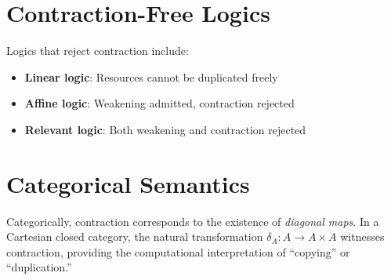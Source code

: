 \section*{Contraction-Free Logics}
\label{sec-contraction-free}

Logics that reject contraction include:
\begin{itemize}
    \item \textbf{Linear logic}: Resources cannot be duplicated freely
    \item \textbf{Affine logic}: Weakening admitted, contraction rejected
    \item \textbf{Relevant logic}: Both weakening and contraction rejected
\end{itemize}

\section*{Categorical Semantics}
\label{sec-contraction-categorical}

Categorically, contraction corresponds to the existence of \emph{diagonal maps}. In a Cartesian closed category, the natural transformation $\delta_A : A \to A \times A$ witnesses contraction, providing the computational interpretation of ``copying'' or ``duplication.''

% 
% 
% 
% 
% 
